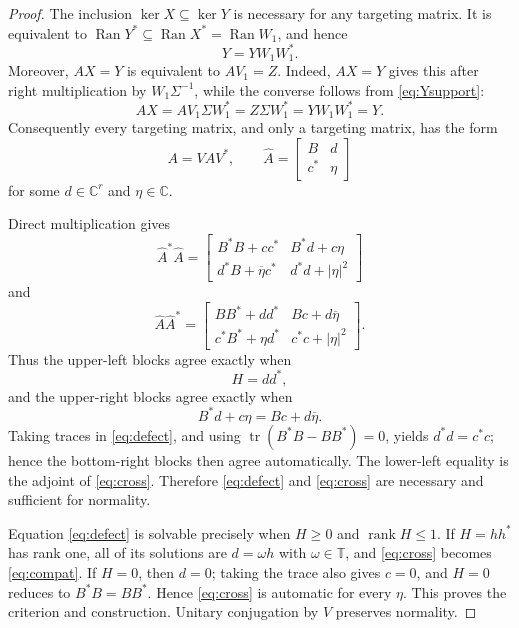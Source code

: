 \documentclass[11pt]{article}
\newcommand{\C}{\mathbb C}
\newcommand{\T}{\mathbb T}
\newcommand{\rank}{\operatorname{rank}}
\newcommand{\Ran}{\operatorname{Ran}}
\begin{document}
\begin{proof}
The inclusion $\ker X\subseteq\ker Y$ is necessary for any targeting matrix.
It is equivalent to $\Ran Y^*\subseteq\Ran X^*=\Ran W_1$, and hence
\begin{equation}\label{eq:Ysupport}
 Y=YW_1W_1^*.
\end{equation}
Moreover, $AX=Y$ is equivalent to $AV_1=Z$.  Indeed, $AX=Y$ gives this after
right multiplication by $W_1\Sigma^{-1}$, while the converse follows from
\eqref{eq:Ysupport}:
\[
 AX=AV_1\Sigma W_1^*=Z\Sigma W_1^*=YW_1W_1^*=Y.
\]
Consequently every targeting matrix, and only a targeting matrix, has the
form
\[
 A=V\widehat A V^*,\qquad
 \widehat A=\begin{bmatrix}B&d\\c^*&\eta\end{bmatrix}
\]
for some $d\in\C^r$ and $\eta\in\C$.

Direct multiplication gives
\[
 \widehat A^*\widehat A=
 \begin{bmatrix}
 B^*B+cc^*&B^*d+c\eta\\
 d^*B+\overline\eta c^*&d^*d+|\eta|^2
 \end{bmatrix}
\]
and
\[
 \widehat A\widehat A^*=
 \begin{bmatrix}
 BB^*+dd^*&Bc+d\overline\eta\\
 c^*B^*+\eta d^*&c^*c+|\eta|^2
 \end{bmatrix}.
\]
Thus the upper-left blocks agree exactly when
\begin{equation}\label{eq:defect}
 H=dd^*,
\end{equation}
and the upper-right blocks agree exactly when
\begin{equation}\label{eq:cross}
 B^*d+c\eta=Bc+d\overline\eta.
\end{equation}
Taking traces in \eqref{eq:defect}, and using
$\operatorname{tr}(B^*B-BB^*)=0$, yields $d^*d=c^*c$; hence the bottom-right
blocks then agree automatically.  The lower-left equality is the adjoint of
\eqref{eq:cross}.  Therefore \eqref{eq:defect} and \eqref{eq:cross} are
necessary and sufficient for normality.

Equation \eqref{eq:defect} is solvable precisely when $H\ge0$ and
$\rank H\le1$.  If $H=hh^*$ has rank one, all of its solutions are
$d=\omega h$ with $\omega\in\T$, and \eqref{eq:cross} becomes
\eqref{eq:compat}.  If $H=0$, then $d=0$; taking the trace also gives $c=0$,
and $H=0$ reduces to $B^*B=BB^*$.  Hence \eqref{eq:cross} is automatic for
every $\eta$.  This proves the criterion and construction.  Unitary
conjugation by $V$ preserves normality.
\end{proof}
\end{document}
